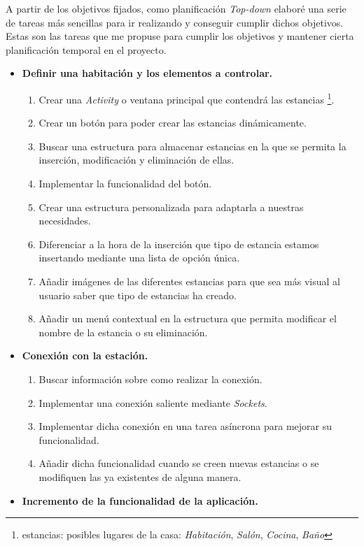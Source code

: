 A partir de los objetivos fijados, como planificación \textit{Top-down} elaboré una serie de tareas más sencillas para ir realizando y conseguir cumplir dichos objetivos. Estas son las tareas que me propuse para cumplir los objetivos y mantener cierta planificación temporal en el proyecto.

\begin{itemize}
	\item \textbf{Definir una habitación y los elementos a controlar.} 
	\begin{enumerate}
		\item Crear una \textit{Activity} o ventana principal que contendrá las estancias \footnote{estancias: posibles lugares de la casa: \textit{Habitación}, \textit{Salón}, \textit{Cocina}, \textit{Baño}}.
		\item Crear un botón para poder crear las estancias dinámicamente.
		\item Buscar una estructura para almacenar estancias en la que se permita la inserción, modificación y eliminación de ellas.
		\item Implementar la funcionalidad del botón.
		\item Crear una estructura personalizada para adaptarla a nuestras necesidades.
		\item Diferenciar a la hora de la inserción que tipo de estancia estamos insertando mediante una lista de opción única.
		\item Añadir imágenes de las diferentes estancias para que sea más visual al usuario saber que tipo de estancias ha creado.
		\item Añadir un menú contextual en la estructura que permita modificar el nombre de la estancia o su eliminación.
	\end{enumerate}
	\item \textbf{Conexión con la estación.}
	\begin{enumerate}
		\item Buscar información sobre como realizar la conexión.
		\item Implementar una conexión saliente mediante \textit{Sockets}.
		\item Implementar dicha conexión en una tarea asíncrona para mejorar su funcionalidad.
		\item Añadir dicha funcionalidad cuando se creen nuevas estancias o se modifiquen las ya existentes de alguna manera.
	\end{enumerate}
	\item \textbf{Incremento de la funcionalidad de la aplicación.}

\end{itemize}
